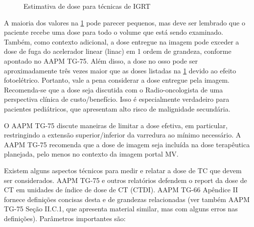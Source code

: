 \documentclass[11pt,a4paper]{article}
\begin{document}
    \begin{figure}[h]
        \centering
        \caption{Estimativa de dose para técnicas de IGRT}
        \label{fig:doseEstimadasParaImagens}
    \end{figure}

    A maioria dos valores na \ref{fig:doseEstimadasParaImagens} pode parecer pequenos, mas deve ser lembrado que o paciente recebe uma dose para todo o volume que está sendo examinado. Também, como contexto adicional, a dose entregue na imagem pode exceder a dose de fuga do acelerador linear (linac) em 1 ordem de grandeza, conforme apontado no AAPM TG-75. Além disso, a dose no osso pode ser aproximadamente três vezes maior que as doses listadas na \ref{fig:doseEstimadasParaImagens} devido ao efeito fotoelétrico. Portanto, vale a pena considerar a dose entregue pela imagem. Recomenda-se que a dose seja discutida com o Radio-oncologista de uma perspectiva clínica de custo/benefício. Isso é especialmente verdadeiro para pacientes pediátricos, que apresentam alto risco de malignidade secundária.
    
    O AAPM TG-75 discute maneiras de limitar a dose efetiva, em particular, restringindo a extensão superior/inferior da varredura ao mínimo necessário. A AAPM TG-75 recomenda que a dose de imagem seja incluída na dose terapêutica planejada, pelo menos no contexto da imagem portal MV.

    Existem alguns aspectos técnicos para medir e relatar a dose de TC que devem ser considerados. AAPM TG-75 e outros relatórios defendem o report da dose de CT em unidades de índice de dose de CT (CTDI). AAPM TG-66 Apêndice II fornece definições concisas desta e de grandezas relacionadas (ver também AAPM TG-75 Seção II.C.1, que apresenta material similar, mas com alguns erros nas definições). Parâmetros importantes são:
\end{document}
